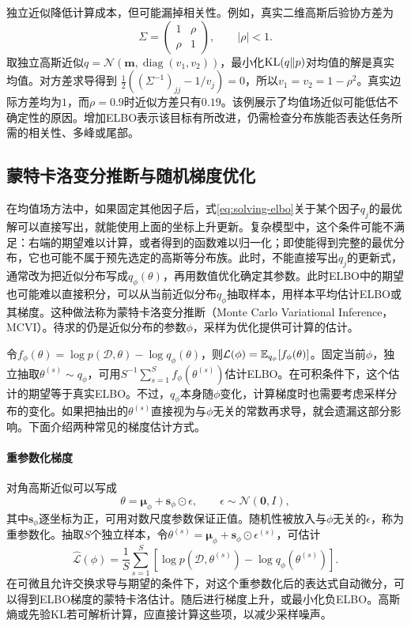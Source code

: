 独立近似降低计算成本，但可能漏掉相关性。例如，真实二维高斯后验协方差为
\begin{equation}
 \Sigma=\begin{pmatrix}1&\rho\\\rho&1\end{pmatrix},\qquad |\rho|<1.
\end{equation}
取独立高斯近似$q=\mathcal N(\bm m,\operatorname{diag}(v_1,v_2))$，最小化$\operatorname{KL}(q\|p)$对均值的解是真实均值。对方差求导得到
$\tfrac12((\Sigma^{-1})_{jj}-1/v_j)=0$，所以$v_1=v_2=1-\rho^2$。真实边际方差均为$1$，而$\rho=0.9$时近似方差只有$0.19$。该例展示了均值场近似可能低估不确定性的原因。增加ELBO表示该目标有所改进，仍需检查分布族能否表达任务所需的相关性、多峰或尾部。

\subsection{蒙特卡洛变分推断与随机梯度优化}
在均值场方法中，如果固定其他因子后，式\eqref{eq:solving-elbo}关于某个因子$q_j$的最优解可以直接写出，就能使用上面的坐标上升更新。复杂模型中，这个条件可能不满足：右端的期望难以计算，或者得到的函数难以归一化；即使能得到完整的最优分布，它也可能不属于预先选定的高斯等分布族。此时，不能直接写出$q_j$的更新式，通常改为把近似分布写成$q_\phi(\theta)$，再用数值优化确定其参数。此时ELBO中的期望也可能难以直接积分，可以从当前近似分布$q_\phi$抽取样本，用样本平均估计ELBO或其梯度。这种做法称为蒙特卡洛变分推断（Monte Carlo Variational Inference，MCVI）。待求的仍是近似分布的参数$\phi$，采样为优化提供可计算的估计。

令$f_\phi(\theta)=\log p(\mathcal D,\theta)-\log q_\phi(\theta)$，则$\mathcal L(\phi)=\mathbb{E}_{q_\phi}[f_\phi(\theta)]$。固定当前$\phi$，独立抽取$\theta^{(s)}\sim q_\phi$，可用$S^{-1}\sum_{s=1}^S f_\phi(\theta^{(s)})$估计ELBO。在可积条件下，这个估计的期望等于真实ELBO。不过，$q_\phi$本身随$\phi$变化，计算梯度时也需要考虑采样分布的变化。如果把抽出的$\theta^{(s)}$直接视为与$\phi$无关的常数再求导，就会遗漏这部分影响。下面介绍两种常见的梯度估计方式。

\paragraph{重参数化梯度}
对角高斯近似可以写成
\begin{equation}
 \theta=\bm\mu_\phi+\bm s_\phi\odot\epsilon,
 \qquad \epsilon\sim\mathcal N(\bm0,I),
 \label{eq:solving-reparameterization}
\end{equation}
其中$\bm s_\phi$逐坐标为正，可用对数尺度参数保证正值。随机性被放入与$\phi$无关的$\epsilon$，称为重参数化。抽取$S$个独立样本，令$\theta^{(s)}=\bm\mu_\phi+\bm s_\phi\odot\epsilon^{(s)}$，可估计
\begin{equation}
 \widehat{\mathcal L}(\phi)=\frac1S\sum_{s=1}^S
 [\log p(\mathcal D,\theta^{(s)})-\log q_\phi(\theta^{(s)})].
\end{equation}
在可微且允许交换求导与期望的条件下，对这个重参数化后的表达式自动微分，可以得到ELBO梯度的蒙特卡洛估计。随后进行梯度上升，或最小化负ELBO。高斯熵或先验KL若可解析计算，应直接计算这些项，以减少采样噪声。

